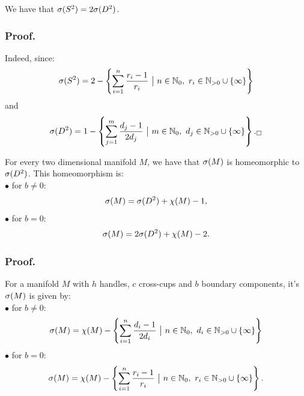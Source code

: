 \begin{observation}\label{2times homeomorphism}
We have that ${{\sigma}(S^2)} = 2{{\sigma}(D^2)}$.
\end{observation}
\subsubsection{Proof.}

Indeed, since: 
\begin{align}
\spe(S^2) = 2 -\left\{\sum\limits_{i=1}^n \frac{r_i-1}{r_i}\ \big|\ n\in\mathbb{N}_0,\ 
r_i\in\mathbb{N}_{>0}\cup \{\infty\}\right\}
\end{align}
and 
\begin{align}
\spe(D^2) = 1 - \left\{\sum\limits_{j=1}^m\frac{d_j-1}{2d_j}\ 
\big|\ m\in\mathbb{N}_0,\ d_j\in\mathbb{N}_{>0}\cup \{\infty\}\right\}._\square
\end{align}

\begin{observation}\label{all_spectra_are_isomorphic}\label{spe_M}
For every two dimensional manifold $M$, we have that ${\sigma}(M)$ is homeomorphic to ${{\sigma}(D^2)}$. 
This homeomorphism is: \\
$\bullet$ for $b \neq 0$:
\begin{equation}
{\sigma}(M) = {{\sigma}(D^2)} + \chi(M) - 1, 
\end{equation}
$\bullet$ for $b = 0$:
\begin{equation}
{\sigma}(M) = 2{{\sigma}(D^2)} + \chi(M) - 2.
\end{equation}  
\end{observation}

\subsubsection{Proof.}
For a manifold $M$ with $h$ handles, $c$ cross-cups and $b$ boundary components, it's 
${{\sigma}(M)}$ is given by:\\
$\bullet$ for $b\neq 0$: 
\begin{equation}
\spe(M) = \chi(M) - \left\{\sum\limits_{i=1}^n\frac{d_i-1}{2d_i}\ 
\big|\ n\in\mathbb{N}_0,\ d_i\in\mathbb{N}_{>0}\cup \{\infty\}\right\}
\end{equation}
$\bullet$ for $b = 0$:
\begin{equation}
\spe(M) = \chi(M) - \left\{\sum\limits_{i=1}^n \frac{r_i-1}{r_i}\ \big|\ n\in\mathbb{N}_0,\ 
r_i\in\mathbb{N}_{>0}\cup \{\infty\}\right\}.
\end{equation} 

